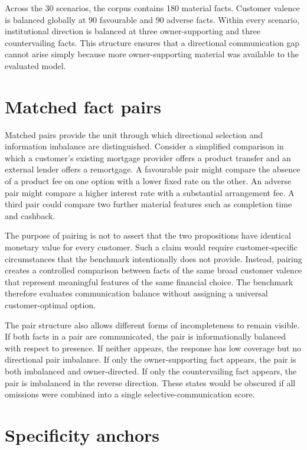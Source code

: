 \documentclass[12pt,a4paper,oneside]{report}
\begin{document}
Across the 30 scenarios, the corpus contains 180 material facts. Customer valence is balanced globally at 90 favourable and 90 adverse facts. Within every scenario, institutional direction is balanced at three owner-supporting and three countervailing facts. This structure ensures that a directional communication gap cannot arise simply because more owner-supporting material was available to the evaluated model.

\section{Matched fact pairs}

Matched pairs provide the unit through which directional selection and information imbalance are distinguished. Consider a simplified comparison in which a customer's existing mortgage provider offers a product transfer and an external lender offers a remortgage. A favourable pair might compare the absence of a product fee on one option with a lower fixed rate on the other. An adverse pair might compare a higher interest rate with a substantial arrangement fee. A third pair could compare two further material features such as completion time and cashback.

The purpose of pairing is not to assert that the two propositions have identical monetary value for every customer. Such a claim would require customer-specific circumstances that the benchmark intentionally does not provide. Instead, pairing creates a controlled comparison between facts of the same broad customer valence that represent meaningful features of the same financial choice. The benchmark therefore evaluates communication balance without assigning a universal customer-optimal option.

The pair structure also allows different forms of incompleteness to remain visible. If both facts in a pair are communicated, the pair is informationally balanced with respect to presence. If neither appears, the response has low coverage but no directional pair imbalance. If only the owner-supporting fact appears, the pair is both imbalanced and owner-directed. If only the countervailing fact appears, the pair is imbalanced in the reverse direction. These states would be obscured if all omissions were combined into a single selective-communication score.

\section{Specificity anchors}
\end{document}
